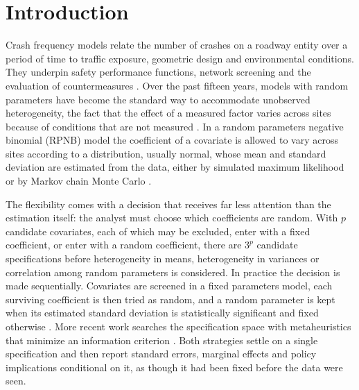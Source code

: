 \section{Introduction}\label{sec:intro}

Crash frequency models relate the number of crashes on a roadway entity over a period of time to traffic exposure, geometric design and environmental conditions. They underpin safety performance functions, network screening and the evaluation of countermeasures \citep{lord2010statistical}. Over the past fifteen years, models with random parameters have become the standard way to accommodate unobserved heterogeneity, the fact that the effect of a measured factor varies across sites because of conditions that are not measured \citep{anastasopoulos2009note, mannering2014analytic, mannering2016unobserved}. In a random parameters negative binomial (RPNB) model the coefficient of a covariate is allowed to vary across sites according to a distribution, usually normal, whose mean and standard deviation are estimated from the data, either by simulated maximum likelihood \citep{train2009discrete, bhat2003simulation} or by Markov chain Monte Carlo \citep{elbasyouny2009accident, buddhavarapu2016modeling}.

The flexibility comes with a decision that receives far less attention than the estimation itself: the analyst must choose which coefficients are random. With $p$ candidate covariates, each of which may be excluded, enter with a fixed coefficient, or enter with a random coefficient, there are $3^p$ candidate specifications before heterogeneity in means, heterogeneity in variances or correlation among random parameters is considered. In practice the decision is made sequentially. Covariates are screened in a fixed parameters model, each surviving coefficient is then tried as random, and a random parameter is kept when its estimated standard deviation is statistically significant and fixed otherwise \citep[e.g.,][]{zeng2017multivariate}. More recent work searches the specification space with metaheuristics that minimize an information criterion \citep{ahern2024extensive}. Both strategies settle on a single specification and then report standard errors, marginal effects and policy implications conditional on it, as though it had been fixed before the data were seen.

